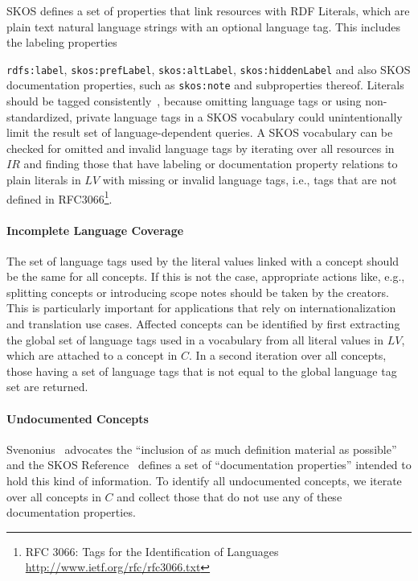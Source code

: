 SKOS defines a set of properties that link resources with RDF Literals, which are plain text natural language strings with an optional language tag. This includes the labeling properties {\texttt{rdfs:label}, \texttt{skos:prefLabel}, \texttt{skos:altLabel}, \texttt{skos:hiddenLabel} and also SKOS documentation properties, such as \texttt{skos:note} and subproperties thereof. Literals should be tagged consistently~\cite{Vrandecic2010}, because omitting language tags or using non-standardized, private language tags in a SKOS vocabulary could unintentionally limit the result set of language-dependent queries.
A SKOS vocabulary can be checked for omitted and invalid language tags by iterating over all resources in $IR$ and finding those that have labeling or documentation property relations to plain literals in $LV$ with missing or invalid language tags, i.e., tags that are not defined in RFC3066\footnote{RFC 3066: Tags for the Identification of Languages \url{http://www.ietf.org/rfc/rfc3066.txt}}.

\paragraph{Incomplete Language Coverage}

The set of language tags used by the literal values linked with a concept should be the same for all concepts. If this is not the case, appropriate actions like, e.g., splitting concepts or introducing scope notes should be taken by the creators. This is particularly important for applications that rely on internationalization and translation use cases.
Affected concepts can be identified by first extracting the global set of language tags used in a vocabulary from all literal values in $LV$, which are attached to a concept in $C$. In a second iteration over all concepts, those having a set of language tags that is not equal to the global language tag set are returned.

\paragraph{Undocumented Concepts}

Svenonius~\cite{Svenonius1997} advocates the ``inclusion of as much definition material as possible'' and the SKOS Reference~\cite{SkosReference2008} defines a set of ``documentation properties'' intended to hold this kind of information.
To identify all undocumented concepts, we iterate over all concepts in $C$ and collect those that do not use any of these documentation properties.

}
